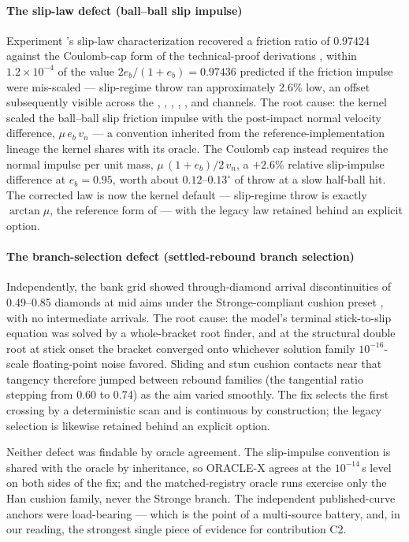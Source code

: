 \paragraph{The slip-law defect (ball--ball slip impulse)}
Experiment 's slip-law characterization recovered a friction
ratio of 0.97424 against the Coulomb-cap form of the technical-proof
derivations \citep{alciatore_tp_catalog}, within $1.2\times10^{-4}$ of
the value $2e_b/(1+e_b) = 0.97436$ predicted if the friction impulse were
mis-scaled --- slip-regime throw ran approximately 2.6\% low, an offset
subsequently visible across the , , ,
, , and  channels. The root cause: the
kernel scaled the ball--ball slip friction impulse with the post-impact
normal velocity difference, $\mu\,e_b\,v_n$ --- a convention inherited
from the reference-implementation lineage the kernel shares with its
oracle. The Coulomb cap instead requires the normal impulse per unit
mass, $\mu\,(1+e_b)/2\,v_n$, a $+2.6$\% relative slip-impulse difference
at $e_b = 0.95$, worth about $0.12$--$0.13^\circ$ of throw at a slow
half-ball hit. The corrected law is now the kernel default ---
slip-regime throw is exactly $\arctan\mu$, the reference form of
\citet{alciatore_tp_a14} --- with the legacy law retained behind an
explicit option.

\paragraph{The branch-selection defect (settled-rebound branch selection)}
Independently, the  bank grid showed through-diamond arrival
discontinuities of 0.49--0.85 diamonds at mid aims under the
Stronge-compliant cushion preset \citep{stronge2018impact}, with no
intermediate arrivals. The root cause: the model's terminal stick-to-slip
equation was solved by a whole-bracket root finder, and at the structural
double root at stick onset the bracket converged onto whichever solution
family $10^{-16}$-scale floating-point noise favored. Sliding and stun
cushion contacts near that tangency therefore jumped between rebound
families (the tangential ratio stepping from 0.60 to 0.74) as the aim
varied smoothly. The fix selects the first crossing by a deterministic
scan and is continuous by construction; the legacy selection is likewise
retained behind an explicit option.

Neither defect was findable by oracle agreement. The slip-impulse
convention is shared with the oracle by inheritance, so ORACLE-X agrees
at the $10^{-14}$\,s level on both sides of the fix; and the
matched-registry oracle runs exercise only the Han cushion family, never
the Stronge branch. The independent published-curve anchors were
load-bearing --- which is the point of a multi-source battery, and, in
our reading, the strongest single piece of evidence for contribution C2.


